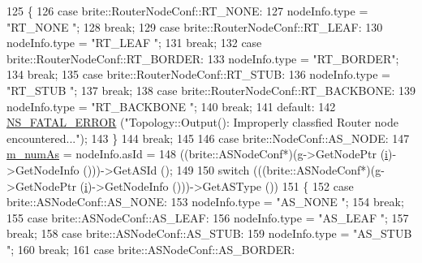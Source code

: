 \begin{DoxyCode}
125             \{
126             \textcolor{keywordflow}{case} brite::RouterNodeConf::RT\_NONE:
127               nodeInfo.type = \textcolor{stringliteral}{"RT\_NONE "};
128               \textcolor{keywordflow}{break};
129             \textcolor{keywordflow}{case} brite::RouterNodeConf::RT\_LEAF:
130               nodeInfo.type = \textcolor{stringliteral}{"RT\_LEAF "};
131               \textcolor{keywordflow}{break};
132             \textcolor{keywordflow}{case} brite::RouterNodeConf::RT\_BORDER:
133               nodeInfo.type = \textcolor{stringliteral}{"RT\_BORDER"};
134               \textcolor{keywordflow}{break};
135             \textcolor{keywordflow}{case} brite::RouterNodeConf::RT\_STUB:
136               nodeInfo.type = \textcolor{stringliteral}{"RT\_STUB "};
137               \textcolor{keywordflow}{break};
138             \textcolor{keywordflow}{case} brite::RouterNodeConf::RT\_BACKBONE:
139               nodeInfo.type = \textcolor{stringliteral}{"RT\_BACKBONE "};
140               \textcolor{keywordflow}{break};
141             \textcolor{keywordflow}{default}:
142               \hyperlink{group__fatal_ga5131d5e3f75d7d4cbfd706ac456fdc85}{NS\_FATAL\_ERROR} (\textcolor{stringliteral}{"Topology::Output(): Improperly classfied Router node
       encountered..."});
143             \}
144           \textcolor{keywordflow}{break};
145 
146         \textcolor{keywordflow}{case} brite::NodeConf::AS\_NODE:
147           \hyperlink{classns3_1_1BriteTopologyHelper_a4dc95255dc0dfeeabd5e2fcd1d31cb13}{m\_numAs} = nodeInfo.asId =
148               ((brite::ASNodeConf*)(g->GetNodePtr (\hyperlink{bernuolliDistribution_8m_a6f6ccfcf58b31cb6412107d9d5281426}{i})->GetNodeInfo ()))->GetASId ();
149 
150           \textcolor{keywordflow}{switch} (((brite::ASNodeConf*)(g->GetNodePtr (\hyperlink{bernuolliDistribution_8m_a6f6ccfcf58b31cb6412107d9d5281426}{i})->GetNodeInfo ()))->GetASType ())
151             \{
152             \textcolor{keywordflow}{case} brite::ASNodeConf::AS\_NONE:
153               nodeInfo.type = \textcolor{stringliteral}{"AS\_NONE "};
154               \textcolor{keywordflow}{break};
155             \textcolor{keywordflow}{case} brite::ASNodeConf::AS\_LEAF:
156               nodeInfo.type = \textcolor{stringliteral}{"AS\_LEAF "};
157               \textcolor{keywordflow}{break};
158             \textcolor{keywordflow}{case} brite::ASNodeConf::AS\_STUB:
159               nodeInfo.type = \textcolor{stringliteral}{"AS\_STUB "};
160               \textcolor{keywordflow}{break};
161             \textcolor{keywordflow}{case} brite::ASNodeConf::AS\_BORDER:

\end{DoxyCode}
